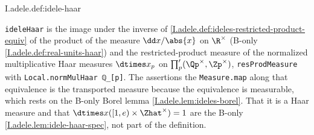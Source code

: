 \begin{definition}
\end{definition}
\begin{tfformal}{I.adele.def:idele-haar}
\begin{tffidelity}
\texttt{ideleHaar} is the image under the inverse of \cref{I.adele.def:ideles-restricted-product-equiv} of the product of the measure $\dd x/\abs{x}$ on $\R^\times$ (B-only \cref{I.adele.def:real-units-haar}) and the restricted-product measure of the normalized multiplicative Haar measures $\dtimes x_p$ on $\prod'_p(\Qp^\times,\Zp^\times)$, \texttt{resProdMeasure} with \texttt{Local.normMulHaar ℚ\_[p]}. The assertions the \texttt{Measure.map} along that equivalence is the transported measure because the equivalence is measurable, which rests on the B-only Borel lemma \cref{I.adele.lem:ideles-borel}. That it is a Haar measure and that $\dtimes x([1,e)\times\Zhat^\times)=1$ are the B-only \cref{I.adele.lem:idele-haar-spec}, not part of the definition.
\end{tffidelity}
\end{tfformal}

